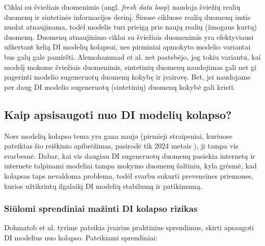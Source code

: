 \documentclass{VUMIFInfKursinis}
\begin{document}
 \label{CiklaiSuSvieziaisDuomenimis}
Ciklai su šviežiais duomenimis (angl. \textsl{fresh data loop}) naudoja šviežių realių duomenų ir sintetinės informacijos derinį. Šiuose cikluose realių duomenų imtis nuolat atnaujinama, todėl modelis turi prieigą prie naujų realių (žmogaus kurtų) duomenų. Duomenų atnaujinimo ciklai su šviežiais duomenimis yra efektyviausi užkertant kelią DI modelių kolapsui, nes  pirminiai apmokyto modelio variantai bus galų gale pamiršti. Alemohammad et al. \cite{ModelsGoMAD} net pastebėjo, jog tokiu variantu, kai modelį mokome šviežiais duomenimis, sintetinių duomenų naudojimas gali net gi pagerinti modelio sugeneruotų duomenų kokybę ir įvairovę. Bet, jei naudojame per daug DI modelio sugeneruotų (sintetinių) duomenų kokybė gali kristi. 



\subsection{Kaip apsisaugoti nuo DI modelių kolapso?}

Nors modelių kolapso tema yra gana nauja (pirmieji straipsniai, kuriuose pateiktas šio reiškinio apibrėžimas, pasirodė tik 2024 metais \cite{AICollapseNature}), ji tampa vis svarbesnė. Dabar, kai vis daugiau DI sugeneruotų duomenų pasiekia internetą ir internete talpinami modeliai tampa mokymo duomenų šaltiniu, kyla grėsmė, kad kolapsas taps nevaldoma problema, todėl svarbu sukurti prevencines priemones, kurios užtikrintų ilgalaikį DI modelių stabilumą ir patikimumą.

\subsubsection{Siūlomi sprendiniai mažinti DI kolapso rizikas}

Dohmatob et al. \cite{DesniuPasiulymai} tyrime pateikia įvairius praktinius sprendimus, skirti apsaugoti DI modelius nuo kolapso. Pateikiami sprendiniai:
\end{document}
